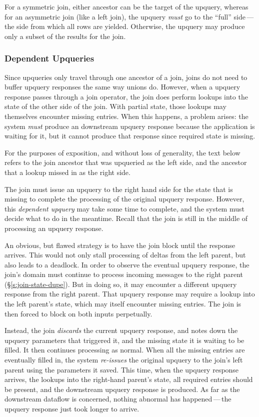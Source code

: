 For a symmetric join, either ancestor can be the target of the upquery, whereas
for an asymmetric join (like a left join), the upquery \emph{must} go to the
``full'' side\,---\,the side from which all rows are yielded. Otherwise, the
upquery may produce only a subset of the results for the join.

\subsubsection{Dependent Upqueries}

Since upqueries only travel through one ancestor of a join, joins do not need to
buffer upquery responses the same way unions do. However, when a upquery
response passes through a join operator, the join does perform lookups into the
state of the other side of the join. With partial state, those lookups may
themselves encounter missing entries. When this happens, a problem arises: the
system \emph{must} produce an downstream upquery response because the
application is waiting for it, but it cannot produce that response since
required state is missing.

For the purposes of exposition, and without loss of generality, the text below
refers to the join ancestor that was upqueried as the left side, and the
ancestor that a lookup missed in as the right side.

The join must issue an upquery to the right hand side for the state that is
missing to complete the processing of the original upquery response. However,
this \textit{dependent upquery} may take some time to complete, and the system
must decide what to do in the meantime. Recall that the join is still in the
middle of processing an upquery response.

An obvious, but flawed strategy is to have the join block until the response
arrives. This would not only stall processing of deltas from the left parent,
but also leads to a deadlock. In order to observe the eventual upquery response,
the join's domain must continue to process incoming messages to the right parent
(\S\ref{s:join-state-dupe}). But in doing so, it may encounter a different
upquery response from the right parent. That upquery response may require a
lookup into the left parent's state, which may itself encounter missing entries.
The join is then forced to block on both inputs perpetually.

Instead, the join \emph{discards} the current upquery response, and notes down
the upquery parameters that triggered it, and the missing state it is waiting to
be filled. It then continues processing as normal. When all the missing entries
are eventually filled in, the system \emph{re-issues} the original upquery to
the join's left parent using the parameters it saved. This time, when the
upquery response arrives, the lookups into the right-hand parent's state, all
required entries should be present, and the downstream upquery response is
produced. As far as the downstream dataflow is concerned, nothing abnormal has
happened\,---\,the upquery response just took longer to arrive.


